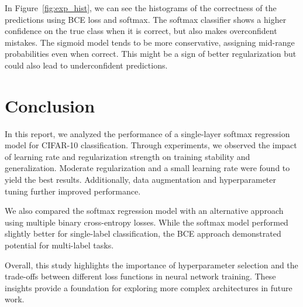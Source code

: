 \documentclass{article}
\begin{document}
In Figure~\ref{fig:exp_hist}, we can see the histograms of the correctness of the predictions using BCE loss and softmax. The softmax classifier shows a higher confidence on the true class when it is correct, but also makes overconfident mistakes. The sigmoid model tends to be more conservative, assigning mid-range probabilities even when correct. This might be a sign of better regularization but could also lead to underconfident predictions.



\section{Conclusion}

In this report, we analyzed the performance of a single-layer softmax regression model for CIFAR-10 classification. Through experiments, we observed the impact of learning rate and regularization strength on training stability and generalization. Moderate regularization and a small learning rate were found to yield the best results. Additionally, data augmentation and hyperparameter tuning further improved performance.

We also compared the softmax regression model with an alternative approach using multiple binary cross-entropy losses. While the softmax model performed slightly better for single-label classification, the BCE approach demonstrated potential for multi-label tasks.

Overall, this study highlights the importance of hyperparameter selection and the trade-offs between different loss functions in neural network training. These insights provide a foundation for exploring more complex architectures in future work.
\end{document}
